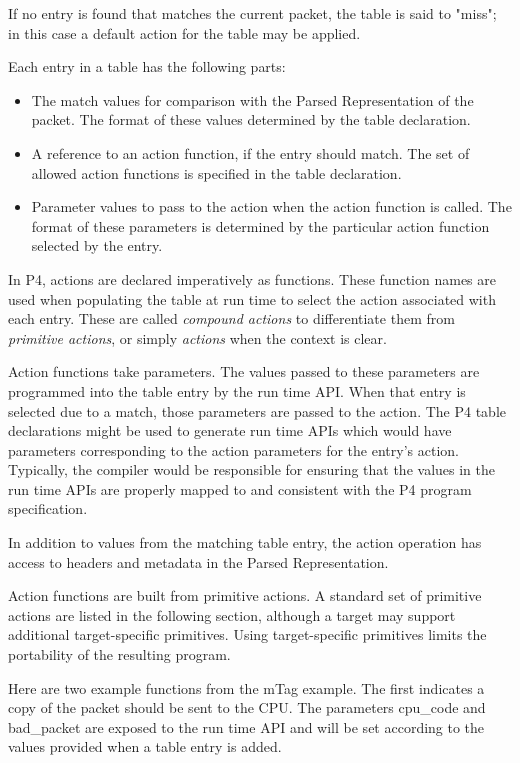 \documentclass[12pt]{article}
\begin{document}
If no entry is found that matches the current packet, the table is said to
"miss"; in this case a default action for the table may be applied.

Each entry in a \matchaction table has the following parts:

\begin{itemize}
\item
The match values for comparison with the Parsed Representation of the packet.
The format of these values determined by the table declaration.
\item
A reference to an action function, if the entry should match. The set
of allowed action functions is specified in the table declaration.
\item
Parameter values to pass to the action when the action function is called.
The format of these parameters is determined by the particular action function
selected by the entry.
\end{itemize}


In P4, actions are declared imperatively as functions. These function
names are used when populating the table at run time to select the
action associated with each entry. These are called \textit{compound
actions} to differentiate them from \textit{primitive actions}, or
simply \textit{actions} when the context is clear.

Action functions take parameters. The values passed to these
parameters are programmed into the table entry by the run time
API. When that entry is selected due to a match, those parameters are
passed to the action. The P4 table declarations might be used to
generate run time APIs which would have parameters corresponding to
the action parameters for the entry's action.  Typically, the compiler
would be responsible for ensuring that the values in the run time APIs
are properly mapped to and consistent with the P4 program
specification.

In addition to values from the matching table entry, the action operation
has access to headers and metadata in the Parsed Representation.

Action functions are built from primitive actions. A standard set of
primitive actions are listed in the following section, although a
target may support additional target-specific primitives. Using
target-specific primitives limits the portability of the resulting
program.

Here are two example functions from the mTag example.  The first indicates
a copy of the packet should be sent to the CPU.  The parameters cpu_code
and bad_packet are exposed to the run time API and will be set according
to the values provided when a table entry is added.
\end{document}
